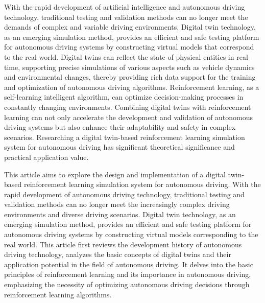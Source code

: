 \begin{abstracten}

    With the rapid development of artificial intelligence and autonomous driving technology, traditional 
    testing and validation methods can no longer meet the demands of complex and variable driving 
    environments. Digital twin technology, as an emerging simulation method, provides an efficient and safe 
    testing platform for autonomous driving systems by constructing virtual models that correspond to the 
    real world. Digital twins can reflect the state of physical entities in real-time, supporting precise 
    simulations of various aspects such as vehicle dynamics and environmental changes, thereby providing 
    rich data support for the training and optimization of autonomous driving algorithms. Reinforcement 
    learning, as a self-learning intelligent algorithm, can optimize decision-making processes in constantly 
    changing environments. Combining digital twins with reinforcement learning can not only accelerate the 
    development and validation of autonomous driving systems but also enhance their adaptability and safety 
    in complex scenarios. Researching a digital twin-based reinforcement learning simulation system for 
    autonomous driving has significant theoretical significance and practical application value.
    
    This article aims to explore the design and implementation of a digital twin-based reinforcement 
    learning simulation system for autonomous driving. With the rapid development of autonomous driving 
    technology, traditional testing and validation methods can no longer meet the increasingly complex 
    driving environments and diverse driving scenarios. Digital twin technology, as an emerging simulation 
    method, provides an efficient and safe testing platform for autonomous driving systems by constructing 
    virtual models corresponding to the real world. This article first reviews the development history of 
    autonomous driving technology, analyzes the basic concepts of digital twins and their application 
    potential in the field of autonomous driving. It delves into the basic principles of reinforcement learning 
    and its importance in autonomous driving, emphasizing the necessity of optimizing autonomous driving 
    decisions through reinforcement learning algorithms.
    

\end{abstracten}
